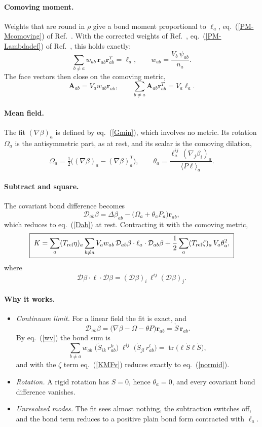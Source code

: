 \documentclass[11pt,aps,preprint,nofootinbib,superscriptaddress,tightenlines]{revtex4-2}
\def\st{\begin{equation}}
\def\stp{\end{equation}}
\def\Eq#1{eq.~(\ref{#1})}
\providecommand{\tr}{\operatorname{tr}}
\newcommand{\avg}[1]{\langle #1\rangle}
\newcommand{\EqPM}[1]{eq.~(\ref{PM-#1}) of Ref.~\cite{ParticleMetrics}}
\let\oldparagraph\paragraph
\renewcommand{\paragraph}{\par\bigskip\oldparagraph}
\begin{document}
\paragraph{Comoving moment.}  Weights that are round in $\rho$ give a bond
moment proportional to $\ell_a$, \EqPM{Mcomoving}.  With the corrected weights
of Ref.~\cite{ParticleMetrics}, \EqPM{Lambdadef}, this holds exactly:
\st
\sum_{b\neq a}w_{ab}\,\bm r_{ab}\bm r_{ab}^T=\ell_a,\qquad
w_{ab}=\frac{V_b\,\psi_{ab}}{n_a} .
\label{wv}
\stp
The face vectors then close on the comoving metric,
\st
\bm A_{ab}=V_aw_{ab}\bm r_{ab},\qquad \sum_{b\neq a}\bm A_{ab}\bm r_{ab}^T=V_a\ell_a .
\stp

\paragraph{Mean field.}  The fit $(\nabla\beta)_a$ is defined by \Eq{Gmin}, which
involves no metric.  Its rotation $\Omega_a$ is the antisymmetric part, as at
rest, and its scalar is the comoving dilation,
\st
\Omega_a=\tfrac12\big((\nabla\beta)_a-(\nabla\beta)_a^T\big),\qquad
\theta_a=\frac{\ell_a^{ij}\,(\nabla_j\beta_i)_a}{\avg{P\ell}_a} .
\label{thetaav}
\stp

\paragraph{Subtract and square.}  The covariant bond difference becomes
\st
\mathcal D_{ab}\beta=\Delta\beta_{ab}-\big(\Omega_a+\theta_aP_a\big)\bm r_{ab},
\label{Dabv}
\stp
which reduces to \Eq{Dab} at rest.  Contracting it with the comoving metric,
\st
\boxed{\;K=\sum_a(T_{\rm rel}\eta)_a\sum_{b\neq a}V_aw_{ab}\,
\mathcal D_{ab}\beta\cdot\ell_a\cdot\mathcal D_{ab}\beta
+\frac12\sum_a(T_{\rm rel}\zeta)_a\,V_a\theta_a^2 ,\;}
\label{KMFv}
\stp
where
\st
\mathcal D\beta\cdot\ell\cdot\mathcal D\beta=(\mathcal D\beta)_i\,\ell^{ij}(\mathcal D\beta)_j .
\stp

\paragraph{Why it works.}
\begin{itemize}
\item \emph{Continuum limit.}  For a linear field the fit is exact, and
  \st
  \mathcal D_{ab}\beta=\big(\nabla\beta-\Omega-\theta P\big)\bm r_{ab}=\mathring S\,\bm r_{ab} .
  \stp
  By \Eq{wv} the bond sum is
  \st
  \sum_{b\neq a}w_{ab}\;\big(\mathring S_{ik}\,r^k_{ab}\big)\;\ell^{ij}\;\big(\mathring S_{jl}\,r^l_{ab}\big)
  =\tr\big(\ell\mathring S\ell\mathring S\big),
  \stp
  and with the $\zeta$ term \Eq{KMFv} reduces exactly to \Eq{normid}.
\item \emph{Rotation.}  A rigid rotation has $S=0$, hence $\theta_a=0$, and every
  covariant bond difference vanishes.
\item \emph{Unresolved modes.}  The fit sees almost nothing, the subtraction
  switches off, and the bond term reduces to a positive plain bond form
  contracted with $\ell_a$.
\end{itemize}
\end{document}
